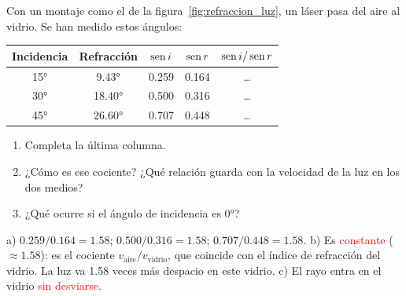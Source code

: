 \begin{exercise}
    Con un montaje como el de la figura~\ref{fig:refraccion_luz}, un láser pasa del aire al vidrio. Se han medido estos ángulos:
    \begin{center}
        \begin{tabular}{@{}ccccc@{}}
            \toprule
            \textbf{Incidencia} & \textbf{Refracción} & \textbf{\(\operatorname{sen} i\)} & \textbf{\(\operatorname{sen} r\)} & \textbf{\(\operatorname{sen} i / \operatorname{sen} r\)} \\
            \midrule
            \ang{15} & \ang{9.43} & \num{0.259} & \num{0.164} & \ldots \\[3pt]
            \ang{30} & \ang{18.40} & \num{0.500} & \num{0.316} & \ldots \\[3pt]
            \ang{45} & \ang{26.60} & \num{0.707} & \num{0.448} & \ldots \\
            \bottomrule
        \end{tabular}
    \end{center}
    \begin{enumerate}[label=\alph*)]
        \item Completa la última columna.
        \item ¿Cómo es ese cociente? ¿Qué relación guarda con la velocidad de la luz en los dos medios?
        \item ¿Qué ocurre si el ángulo de incidencia es \ang{0}?
    \end{enumerate}
    \begin{solu}
        a) \(\num{0.259}/\num{0.164} = \num{1.58}\); \(\num{0.500}/\num{0.316} = \num{1.58}\); \(\num{0.707}/\num{0.448} = \num{1.58}\).
        b) Es \textcolor{red}{constante} (\(\approx \num{1.58}\)): es el cociente \(v_{\text{aire}}/v_{\text{vidrio}}\), que coincide con el índice de refracción del vidrio. La luz va \num{1.58} veces más despacio en este vidrio.
        c) El rayo entra en el vidrio \textcolor{red}{sin desviarse}.
    \end{solu}
\end{exercise}

